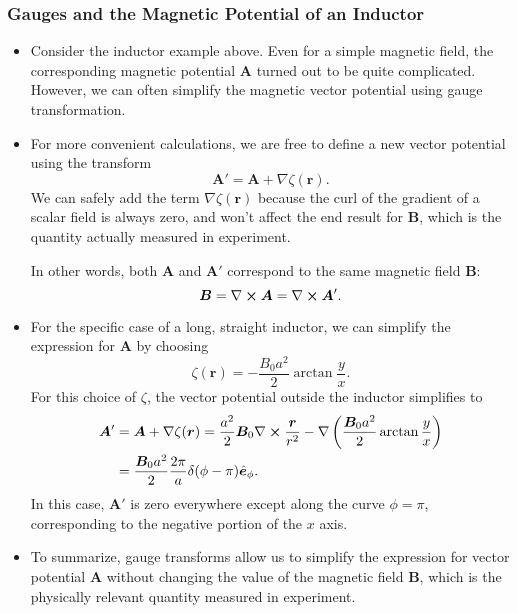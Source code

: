 \documentclass[11pt, a4paper]{article}
\renewcommand{\vec}[1]{\bm{#1}} %
\newcommand{\uvec}[1]{\hat{\vec{#1}}} %
\renewcommand{\r}{\vec{r}}
\newcommand{\B}{\vec{B}} %
\newcommand{\A}{\vec{A}} %
\renewcommand{\curl}{\nabla \cross}
\renewcommand{\grad}{\nabla}
\begin{document}
\subsubsection{Gauges and the Magnetic Potential of an Inductor}
\begin{itemize}
	\item Consider the inductor example above. Even for a simple magnetic field, the corresponding magnetic potential $ \A $ turned out to be quite complicated. However, we can often simplify the magnetic vector potential using gauge transformation. 
	
	
	\item For more convenient calculations, we are free to define a new vector potential using the transform
	\begin{equation*}
		\A' = \A + \grad \zeta (\r).
	\end{equation*}
	We can safely add the term $ \grad \zeta (\r) $ because the curl of the gradient of a scalar field is always zero, and won't affect the end result for $ \B $, which is the quantity actually measured in experiment.

    In other words, both $ \A $ and $ \A' $ correspond to the same magnetic field $ \B $:
	\begin{equation*}
		\B = \curl \A = \curl \A'.
	\end{equation*}
	
	\item For the specific case of a long, straight inductor, we can simplify the expression for $ \A $ by choosing
	\begin{equation*}
		\zeta (\r)  = -\frac{B_{0}a^{2}}{2} \arctan \frac{y}{x}.
	\end{equation*}
	For this choice of $ \zeta $, the vector potential outside the inductor simplifies to
	\begin{align*}
		\A' &= \A + \grad \zeta (\r) = \frac{a^{2}}{2}\B_{0}\curl \frac{\r}{r^{2}} - \grad \left(\frac{\B_{0}a^{2}}{2} \arctan \frac{y}{x}\right)\\
		& = \frac{\B_{0}a^{2}}{2} \frac{2\pi}{a} \delta (\phi - \pi) \uvec{e}_{\phi}.
	\end{align*}
	In this case, $ \A' $ is zero everywhere except along the curve $ \phi = \pi $, corresponding to the negative portion of the $ x $ axis.
	
	\item To summarize, gauge transforms allow us to simplify the expression for vector potential $ \A $ without changing the value of the magnetic field $ \B $, which is the physically relevant quantity measured in experiment.
\end{itemize}
\end{document}
